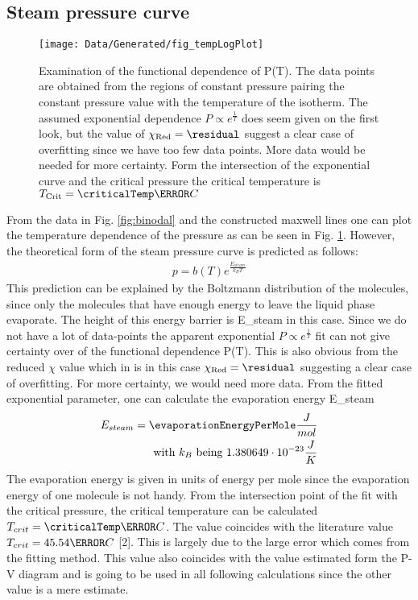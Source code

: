 \documentclass[a4paper,10pt,twocolumn]{article}
\begin{document}
    \subsection{Steam pressure curve}\label{subsec:steamPressureCurve}
    \begin{figure}
        \begin{center}
            \texttt{[image: Data/Generated/fig\_tempLogPlot]}\label{fig:tempLogPLot}
            \caption[]{Examination of the functional dependence of P(T). The data points are obtained from the regions of constant pressure pairing the constant pressure value with the temperature of the isotherm.
            The assumed exponential dependence $P \propto e^{\frac{1}{T}} $ does seem given on the first look, but the value of $\chi_{\text{Red}}=\residual$ suggest a clear case of overfitting since we have
            too few data points. More data would be needed for more certainty. Form the intersection of the exponential curve and the critical pressure the critical temperature is $T_{\text{Crit}}=\criticalTemp\degree C$}
        \end{center}
    \end{figure}
    From the data in Fig. \ref{fig:binodal} and the constructed maxwell lines one can plot the temperature dependence of the pressure as can be seen in Fig. \ref{fig:tempLogPLot}.
    However, the theoretical form of the steam pressure curve is predicted as follows:
    \begin{align}
        p=b(T)e^\frac{E_{steam}}{k_B T}
    \end{align}
    This prediction can be explained by the Boltzmann distribution of the molecules, since only the molecules that have enough energy to leave the liquid phase evaporate.
    The height of this energy barrier is E_{steam}\) in this case.
    Since we do not have a lot of data-points the apparent exponential $P \propto e^{\frac{1}{T}} $ fit can not give certainty over of the functional dependence P(T).
    This is also obvious from the reduced $\chi$ value which in is in this case $\chi_{\text{Red}}=\residual$ suggesting a clear case of overfitting.
    For more certainty, we would need more data.
    From the fitted exponential parameter, one can calculate the evaporation energy E_{steam}\)
    \begin{align}
        E_{steam} = \evaporationEnergyPerMole \frac{J}{mol}
        \endline \text{with } k_B \text{ being } 1.380649\cdot 10^{-23}\frac{J}{K}
    \end{align}
    The evaporation energy is given in units of energy per mole since the evaporation energy of one molecule is not handy. 
    From the intersection point of the fit with the critical pressure, the critical temperature can be calculated $T_{crit}=\criticalTemp\degree C $.
    The value coincides with the literature value $T_{crit} = 45.54\degree C$ [2].
    This is largely due to the large error which comes from the fitting method.
    This value also coincides with the value estimated form the P-V diagram and is going to be used in all following calculations since the other value is a mere estimate.
    
\end{document}
